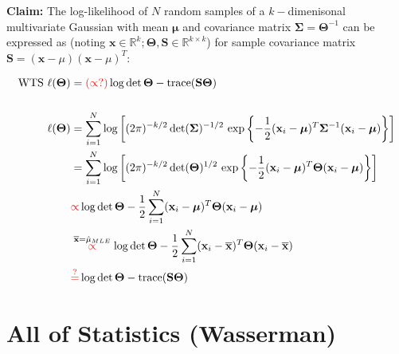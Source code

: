 \documentclass[11pt]{article}
\begin{document}
{\bf Claim:} The log-likelihood of $N$ random samples of a $k-$dimenisonal multivariate Gaussian with mean $\boldsymbol\mu$ and covariance matrix $\boldsymbol\Sigma = \boldsymbol\Theta^{-1}$ can be expressed as (noting $\mathbf{x} \in \mathbb{R}^k; \boldsymbol\Theta, \mathbf{S} \in \mathbb{R}^{k \times k}$) for sample covariance matrix $\mathbf{S} =  (\mathbf{x}-\mu)(\mathbf{x}-\mu)^T$:

\begin{align*}
    \text{WTS }    
    \ell(\boldsymbol\Theta)
    &= \textcolor{red}{(\propto?)}
    \log \det \boldsymbol\Theta
    -
    \text{trace}(\mathbf{S}\boldsymbol\Theta )
    \\
    \\
    \ell(\boldsymbol\Theta)
    &= 
    \sum_{i=1}^N
    \log\left[
    (2\pi)^{-k/2} 
    \det(\boldsymbol\Sigma)^{-1/2}
    \ \text{exp}\left\{ 
    -\frac{1}{2}
    (\mathbf{x}_i-\boldsymbol\mu)^T
    \boldsymbol\Sigma^{-1}
    (\mathbf{x}_i-\boldsymbol\mu)
     \right\}
    \right]
\\
    &= 
    \sum_{i=1}^N
    \log\left[
    (2\pi)^{-k/2} 
    \det(\boldsymbol\Theta)^{1/2}
    \ \text{exp}\left\{ 
    -\frac{1}{2}
    (\mathbf{x}_i-\boldsymbol\mu)^T
    \boldsymbol\Theta
    (\mathbf{x}_i-\boldsymbol\mu)
     \right\}
    \right]   
\\
    &\textcolor{red}{\propto}
    \log \det \boldsymbol\Theta 
    -\frac{1}{2}
    \sum_{i=1}^N
    (\mathbf{x}_i-\boldsymbol\mu)^T
    \boldsymbol\Theta 
    (\mathbf{x}_i-\boldsymbol\mu)    
\\
    &
    \stackrel{
    \overline{\mathbf{x}} = \hat{\mu}_{MLE}
    }
    {
    \textcolor{red}{\propto}
    }
    \log \det \boldsymbol\Theta 
    -
    \frac{1}{2}
    \sum_{i=1}^N
    (\mathbf{x}_i-\overline{\mathbf{x}})^T
    \boldsymbol\Theta 
    (\mathbf{x}_i-\overline{\mathbf{x}})   
\\
    &\textcolor{red}{\stackrel{?}{=}}
    \log \det \boldsymbol\Theta 
    -
    \text{trace}(\mathbf{S}\boldsymbol\Theta) 
\end{align*}

\newpage 
\begin{tcolorbox}
\vspace{4mm}
\bf \LARGE \chapter{All of Statistics (Wasserman)} 
\vspace{4mm}
\end{tcolorbox}
\end{document}
